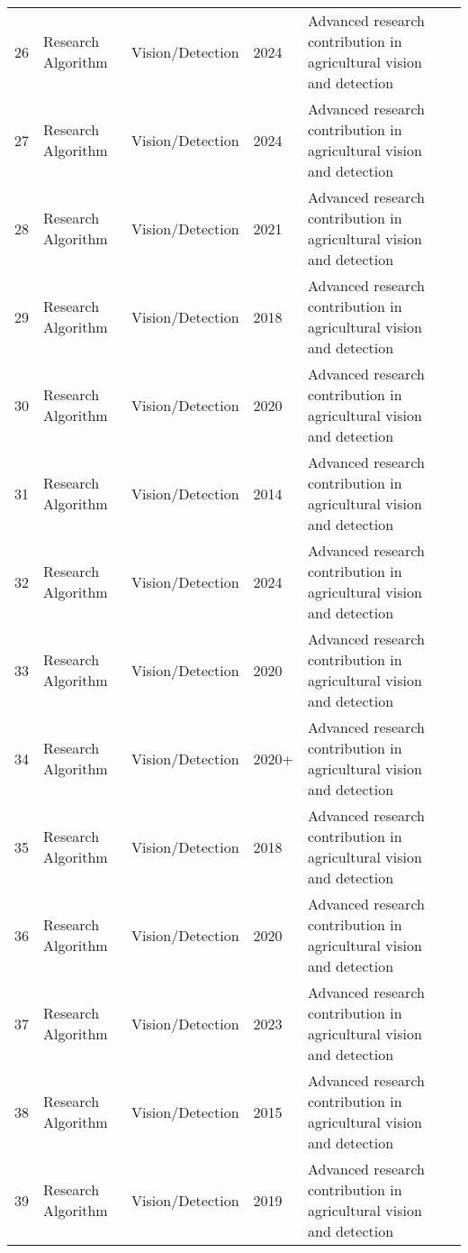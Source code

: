 \begin{table*}[htbp]
\begin{tabular}{p{}p{}p{}p{}p{}p{}}
 26 & Research Algorithm & Vision/Detection & 2024 & Advanced research contribution in agricultural vision and detection & \cite{chen2024deep} \\
 27 & Research Algorithm & Vision/Detection & 2024 & Advanced research contribution in agricultural vision and detection & \cite{chen2024design} \\
 28 & Research Algorithm & Vision/Detection & 2021 & Advanced research contribution in agricultural vision and detection & \cite{chu2021deep} \\
 29 & Research Algorithm & Vision/Detection & 2018 & Advanced research contribution in agricultural vision and detection & \cite{de2018development} \\
 30 & Research Algorithm & Vision/Detection & 2020 & Advanced research contribution in agricultural vision and detection & \cite{dutta2020cleaning} \\
 31 & Research Algorithm & Vision/Detection & 2014 & Advanced research contribution in agricultural vision and detection & \cite{font2014proposal} \\
 32 & Research Algorithm & Vision/Detection & 2024 & Advanced research contribution in agricultural vision and detection & \cite{foodres2024fusion} \\
 33 & Research Algorithm & Vision/Detection & 2020 & Advanced research contribution in agricultural vision and detection & \cite{fountas2020agricultural} \\
 34 & Research Algorithm & Vision/Detection & 2020+ & Advanced research contribution in agricultural vision and detection & \cite{fox1997dynamic} \\
 35 & Research Algorithm & Vision/Detection & 2018 & Advanced research contribution in agricultural vision and detection & \cite{fu2018kiwifruit} \\
 36 & Research Algorithm & Vision/Detection & 2020 & Advanced research contribution in agricultural vision and detection & \cite{fu2020faster} \\
 37 & Research Algorithm & Vision/Detection & 2023 & Advanced research contribution in agricultural vision and detection & \cite{gai2023detection} \\
 38 & Research Algorithm & Vision/Detection & 2015 & Advanced research contribution in agricultural vision and detection & \cite{gao2015reconfigurable} \\
 39 & Research Algorithm & Vision/Detection & 2019 & Advanced research contribution in agricultural vision and detection & \cite{ge2019fruit} \\

\end{tabular}
\end{table*}
